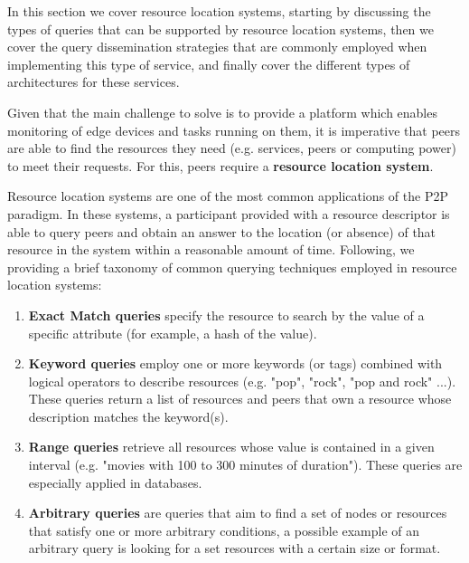 

In this section we cover resource location systems, starting by discussing the types of queries that can be supported by resource location systems, then we cover the query dissemination strategies that are commonly employed when implementing this type of service, and finally cover the different types of architectures for these services.

Given that the main challenge to solve is to provide a platform which enables monitoring of edge devices and tasks running on them, it is imperative that peers are able to find the resources they need (e.g. services, peers or computing power) to meet their requests. For this, peers require a \textbf{resource location system}.

Resource location systems are one of the most common applications of the P2P paradigm. In these systems, a participant provided with a resource descriptor is able to query peers and obtain an answer to the location (or absence) of that resource in the system within a reasonable amount of time. Following, we providing a brief taxonomy of common querying techniques employed in resource location systems:

\begin{enumerate}
    \item \textbf{Exact Match queries} specify the resource to search by the value of a specific attribute (for example, a hash of the value).

    \item \textbf{Keyword queries} employ one or more keywords (or tags) combined with logical operators to describe resources (e.g. "pop", "rock", "pop and rock" ...). These queries return a list of resources and peers that own a resource whose description matches the keyword(s).
    
    \item \textbf{Range queries} retrieve all resources whose value is contained in a given interval (e.g. "movies with 100 to 300 minutes of duration"). These queries are especially applied in databases.
    
    \item \textbf{Arbitrary queries} are queries that aim to find a set of nodes or resources that satisfy one or more arbitrary conditions, a possible example of an arbitrary query is looking for a set resources with a certain size or format.
    
\end{enumerate}

